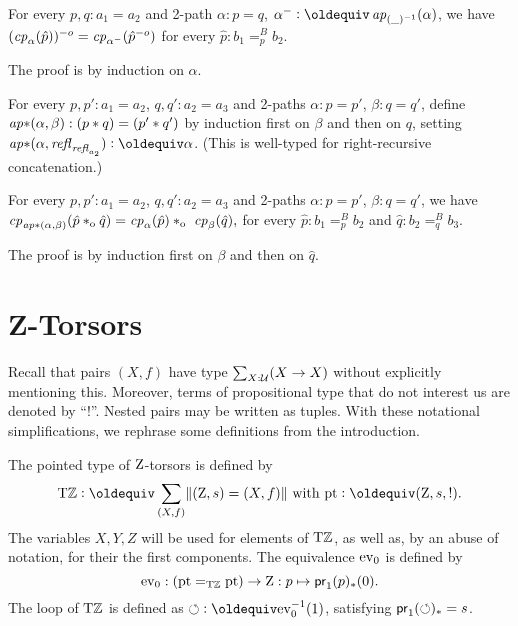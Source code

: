 \documentclass[a4,12pt]{amsart}
\begin{document}
\begin{lemma}\label{lem:inv-change-path}
  For every  $p,q:a_1=a_2$ and 2-path $\alpha : p = q$,
  $\alpha^- \defeq \ap{(\_)^{-1}}(\alpha)$, we have
  $(\mathit{cp}_{\alpha}(\hat p))^{-o} = \mathit{cp}_{\alpha^-}(\hat p^{-o})$
  for every $\hat p: b_1=^B_p b_2$.
\end{lemma}
 The proof is by induction on $\alpha$.

\begin{definition}\label{lem:concat-ap-ap}
  For every  $p,p':a_1=a_2$, $q,q':a_2=a_3$ and 2-paths 
  $\alpha : p = p'$, $\beta : q = q'$, define
  $\mathop{{\it ap}{*}}(\alpha,\beta): (p* q)=(p'* q')$ by induction
  first on $\beta$ and then on $q$, 
  setting $\apc(\alpha,\refl{\refl{a_2}}) \defeq \alpha$.
  (This is well-typed for right-recursive concatenation.)
\end{definition}

\begin{lemma}\label{lem:concat-change-path}
  For every  $p,p':a_1=a_2$, $q,q':a_2=a_3$ and 2-paths 
  $\alpha : p = p'$, $\beta : q = q'$, we have
  $\cp{\apc(\alpha,\beta)}(\hat p \cto \hat q) = 
   \cp{\alpha}(\hat p) \cto  \cp{\beta}(\hat q),$
  for every $\hat p: b_1=^B_p b_2$ and $\hat q: b_2=^B_q b_3$.
\end{lemma}
 The proof is by induction first on $\beta$ and then on $\hat q$.




\section{Z-Torsors}\label{sec:ZTorsors}

Recall that pairs $(X,f)$ have type $\sum_{X:\mathcal{U}}(X\to X)$
without explicitly mentioning this. Moreover, terms of
propositional type that do not interest us are denoted by ``$!$''.
Nested pairs may be written as tuples.
With these notational simplifications, we rephrase
some definitions from the introduction.

\begin{definition}\label{def:TorZ}
The pointed type of $\mathrm{Z}$-torsors is defined by
\[
\TorZ\defeq \sum_{(X,f)}\Trunc{(\zet,s)=(X,f)} \text{~with~} \pt\defeq (\zet,s,!).
\]
The variables $X,Y,Z$ will be used for elements of ${\mathrm{T}\mathbb{Z}}$, 
as well as, by an abuse of notation, for their the first components.
The equivalence $\mathrm{ev}_0$ is defined by
\[
\mathrm{ev}_0: ({\mathord{\mathrm{pt}}} =_{\mathrm{T}\mathbb{Z}} {\mathord{\mathrm{pt}}})\to\mathrm{Z}: p \mapsto \mathsf{pr}_1(p)_*(0).
\]
The loop of ${\mathrm{T}\mathbb{Z}}$ is defined as ${\Zloop}\defeq\ev_0^{-1}(1)$,
satisfying $\mathsf{pr}_1(\circlearrowleft)_* = s$.
\end{definition}
\end{document}
